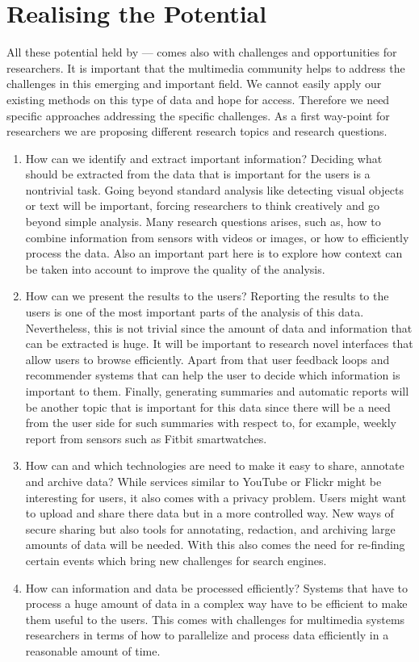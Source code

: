 \section{Realising the Potential}
All these potential held by --- comes also with challenges and opportunities for researchers.
It is important that the multimedia community helps to address the challenges in this emerging and important field. 
We cannot easily apply our existing methods on this type of data and hope for access. Therefore we need specific
approaches addressing the specific challenges.
As a first way-point for researchers we are proposing different research topics and research questions.
\begin{enumerate}
	\item How can we identify and extract important information? Deciding what should be extracted from the data that is important for the users is a nontrivial task. Going beyond standard analysis like detecting visual objects or text will be important, forcing researchers to think creatively and go beyond simple analysis. Many research questions arises, such as, how to combine information from sensors with videos or images, or how to efficiently process the data. Also an important part here is to explore how context can be taken into account to improve the quality of the analysis.
	
	\item How can we present the results to the users? 
	Reporting the results to the users is one of the most important parts of the analysis of this data. Nevertheless, this is not trivial since the amount of data and information that can be extracted is huge. It will be important to research novel interfaces that allow users to browse efficiently. Apart from that user feedback loops and recommender systems that can help the user to decide which information is important to them. Finally, generating summaries and automatic reports will be another topic that is important for this data since there will be a need from the user side for such summaries with respect to, for example, weekly report from sensors such as Fitbit smartwatches.
	
	\item How can and which technologies are need to make it easy to share, annotate and archive data? 
	While services similar to YouTube or Flickr might be interesting for users, it also comes with a privacy problem. Users might want to upload and share there data but in a more controlled way. New ways of secure sharing but also tools for annotating, redaction, and archiving large amounts of data will be needed. With this also comes the need for re-finding certain events which bring new challenges for search engines.  
	
	\item How can information and data be processed efficiently? Systems that have to process a huge amount of data in a complex way have to be efficient to make them useful to the users. This comes with challenges for multimedia systems researchers in terms of how to parallelize and process data efficiently in a reasonable amount of time.
\end{enumerate}

